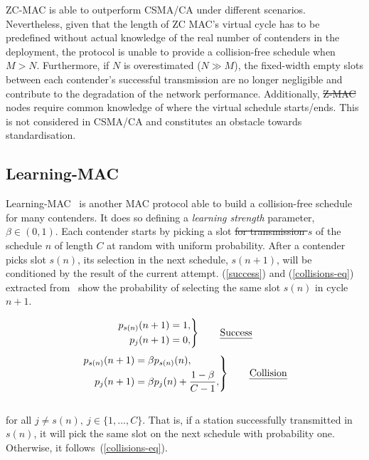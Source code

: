 \documentclass[a4paper,journal]{IEEEtran}
\providecommand{\DIFaddtex}[1]{{\protect\color{blue}\uwave{#1}}} %
\providecommand{\DIFdeltex}[1]{{\protect\color{red}\sout{#1}}}                      %
\providecommand{\DIFaddbegin}{} %
\providecommand{\DIFaddend}{} %
\providecommand{\DIFdelbegin}{} %
\providecommand{\DIFdelend}{} %
\providecommand{\DIFadd}[1]{\texorpdfstring{\DIFaddtex{#1}}{#1}} %
\providecommand{\DIFdel}[1]{\texorpdfstring{\DIFdeltex{#1}}{}} %
\begin{document}
ZC-MAC is able to outperform CSMA/CA under different scenarios. Nevertheless, given that the length of ZC MAC's virtual cycle has to be predefined without actual knowledge of the real number of contenders in the deployment, the protocol is unable to provide a collision-free schedule when \DIFdelbegin \DIFdel{$M>N$}\DIFdelend \DIFaddbegin \DIFadd{$N>M$}\DIFaddend . Furthermore, if \DIFdelbegin \DIFdel{$N$ }\DIFdelend \DIFaddbegin \DIFadd{$M$ }\DIFaddend is overestimated (\DIFdelbegin \DIFdel{$N\gg M$}\DIFdelend \DIFaddbegin \DIFadd{$M\gg N$}\DIFaddend ), the fixed-width empty slots between each contender's successful transmission are no longer negligible and contribute to the degradation of the network performance. Additionally, \DIFdelbegin \DIFdel{Z-MAC }\DIFdelend \DIFaddbegin \DIFadd{ZC-MAC }\DIFaddend nodes require common knowledge of where the virtual schedule starts/ends. This is not considered in CSMA/CA and constitutes an obstacle towards standardisation.

\subsection{Learning-MAC}

Learning-MAC~\cite{L_MAC} is another MAC protocol able to build a collision-free schedule for many contenders. It does so defining a \emph{learning strength} parameter, $\beta\in(0,1)$. Each contender starts by picking a slot \DIFdelbegin \DIFdel{for transmission $s$ }\DIFdelend \DIFaddbegin \DIFadd{$s$ for transmission }\DIFaddend of the schedule $n$ of length $C$ at random with uniform probability. After a contender picks slot $s(n)$, its selection in the next schedule, $s(n+1)$, will be conditioned by the result of the current attempt. (\ref{success}) and (\ref{collisions-eq}) extracted from~\cite{L_MAC} show the probability of selecting the same slot $s(n)$ in cycle $n+1$.

\begin{equation} \label{success}
		\left. \begin{aligned}
			p_{s(n)}(n+1)&=1,\\
			p_{j}(n+1)&=0,
		\end{aligned}
	\right\}
	\qquad \text{\emph{Success}}
\end{equation}
\begin{equation} \label{collisions-eq}
	\left. \begin{aligned}
			p_{s(n)}(n+1)&=\beta p_{s(n)}(n),\\
			p_{j}(n+1)&=\beta p_{j}(n)+\frac{1-\beta}{C -1},
		\end{aligned}
	\right\}
	\qquad \text{\emph{Collision}}
\end{equation}
\\
for all $j\neq s(n),~j\in \{1,\dots ,C\}$. That is, if a station successfully transmitted in $s(n)$, it will pick the same slot on the next schedule with probability one. Otherwise, it follows~(\ref{collisions-eq}).
\end{document}
